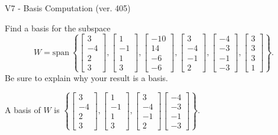 \begin{exercise}
  \begin{exerciseTitle}V7 - Basis Computation (ver. 405)\end{exerciseTitle}
  \begin{exerciseStatement}
    Find a basis for the subspace 
\[W=\mathrm{span}\ \left\{\left[\begin{array}{r}
3 \\
-4 \\
2 \\
3
\end{array}\right] , \left[\begin{array}{r}
1 \\
-1 \\
1 \\
3
\end{array}\right] , \left[\begin{array}{r}
-10 \\
14 \\
-6 \\
-6
\end{array}\right] , \left[\begin{array}{r}
3 \\
-4 \\
-1 \\
2
\end{array}\right] , \left[\begin{array}{r}
-4 \\
-3 \\
-1 \\
-3
\end{array}\right] , \left[\begin{array}{r}
3 \\
3 \\
3 \\
1
\end{array}\right]\right\}.\]
 Be sure to explain why your result is a basis.


  \end{exerciseStatement}
  \begin{exerciseAnswer}
   A basis of \(W\) is  \(\left\{\left[\begin{array}{r}
3 \\
-4 \\
2 \\
3
\end{array}\right] , \left[\begin{array}{r}
1 \\
-1 \\
1 \\
3
\end{array}\right] , \left[\begin{array}{r}
3 \\
-4 \\
-1 \\
2
\end{array}\right] \left[\begin{array}{r}
-4 \\
-3 \\
-1 \\
-3
\end{array}\right]\right\}\).
  


  \end{exerciseAnswer}
\end{exercise}